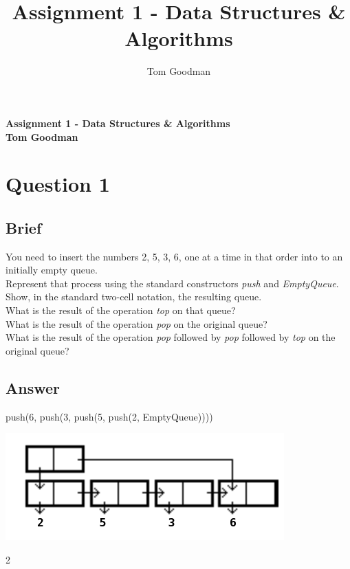 \documentclass{article}
\title{Assignment 1 - Data Structures \& Algorithms}
\author{Tom Goodman}
\date{}
\begin{document}
\begin{titlepage}
	\begin{flushleft}
		\vspace*{1cm}
		\Huge
		\textbf{Assignment 1 - Data Structures \& Algorithms} \\
		\vspace*{1cm}
		\Large
		\textbf{Tom Goodman} \\
	\end{flushleft}
\end{titlepage}
\newpage
\section{Question 1}
\subsection{Brief}
You need to insert the numbers 2, 5, 3, 6, one at a time in that order into to an initially empty queue.
\\ \newline
Represent that process using the standard constructors \textit{push} and \textit{EmptyQueue}.
\\ \newline
Show, in the standard two-cell notation, the resulting queue.
\\ \newline
What is the result of the operation \textit{top} on that queue?
\\ \newline
What is the result of the operation \textit{pop} on the original queue?
\\ \newline
What is the result of the operation \textit{pop} followed by \textit{pop} followed by \textit{top} on the original queue?

\subsection{Answer}
push(6, push(3, push(5, push(2, EmptyQueue))))
\\ \newline
\begin{center}\includegraphics{DSAE1TwoCell.png}\end{center}
2
\\ \newline
[5, 3, 6]
\\ 
\end{document}
